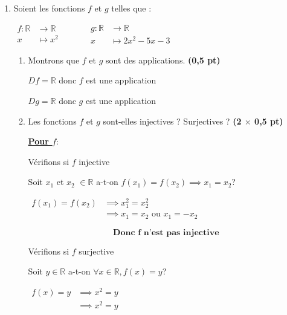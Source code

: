 \documentclass[12pt,a4paper]{article}
\begin{document}
\begin{enumerate}
\item Soient les fonctions \( f \) et \( g \) telles que :

$
    \begin{aligned}
        f : \mathbb{R} & \to \mathbb{R} \\
        x              & \mapsto x^2
    \end{aligned}\quad\quad\quad
    \begin{aligned}
        g : \mathbb{R} & \to \mathbb{R}        \\
        x              & \mapsto 2x^2 - 5x - 3
    \end{aligned}
$
\begin{enumerate}
    \item Montrons que \( f \) et \( g \) sont des applications. \hfill \textbf{(0,5 pt)}

          \( Df=\mathbb{R} \) donc \(f\) est une application

          \( Dg=\mathbb{R} \) donc \(g\) est une application
    \item Les fonctions \( f \) et \( g \) sont-elles injectives ? Surjectives ? \hfill
          \textbf{(2 $\times$ 0,5 pt)}

          \underline{\textbf{Pour \( f \)}}:

            Vérifions si \( f \) injective

          Soit \(x_1\) et \(x_2\) \(\in \mathbb{R}\) a-t-on \(f(x_1)=f(x_2)\implies
          x_1=x_2\)?

          \(\begin{aligned}
              f(x_1)=f(x_2) & \implies x_1^{2}=x_2^{2}              \\
                            & \implies x_1=x_2 \text{ ou } x_1=-x_2
          \end{aligned}\)

          \begin{resultbox}
            \[
                \mathbf{\text{Donc \(f\) n'est pas injective}}
            \]
        \end{resultbox}

          Vérifions si \( f \) surjective

          Soit \(y \in \mathbb{R}\) a-t-on \(\forall x \in \mathbb{R},f(x)=y \)?

          \(
          \begin{aligned}
              f(x)=y & \implies x^{2}=y \\
                     & \implies x^{2}=y
          \end{aligned}
          \)


\end{enumerate}
\end{enumerate}
\end{document}
